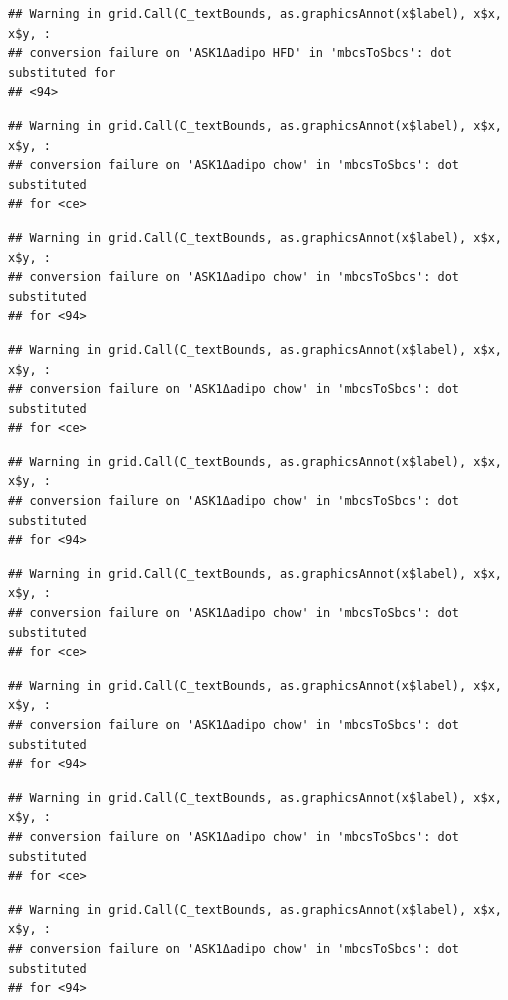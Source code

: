 \documentclass[]{book}
\begin{document}
\begin{verbatim}
## Warning in grid.Call(C_textBounds, as.graphicsAnnot(x$label), x$x, x$y, :
## conversion failure on 'ASK1Δadipo HFD' in 'mbcsToSbcs': dot substituted for
## <94>
\end{verbatim}

\begin{verbatim}
## Warning in grid.Call(C_textBounds, as.graphicsAnnot(x$label), x$x, x$y, :
## conversion failure on 'ASK1Δadipo chow' in 'mbcsToSbcs': dot substituted
## for <ce>
\end{verbatim}

\begin{verbatim}
## Warning in grid.Call(C_textBounds, as.graphicsAnnot(x$label), x$x, x$y, :
## conversion failure on 'ASK1Δadipo chow' in 'mbcsToSbcs': dot substituted
## for <94>
\end{verbatim}

\begin{verbatim}
## Warning in grid.Call(C_textBounds, as.graphicsAnnot(x$label), x$x, x$y, :
## conversion failure on 'ASK1Δadipo chow' in 'mbcsToSbcs': dot substituted
## for <ce>
\end{verbatim}

\begin{verbatim}
## Warning in grid.Call(C_textBounds, as.graphicsAnnot(x$label), x$x, x$y, :
## conversion failure on 'ASK1Δadipo chow' in 'mbcsToSbcs': dot substituted
## for <94>
\end{verbatim}

\begin{verbatim}
## Warning in grid.Call(C_textBounds, as.graphicsAnnot(x$label), x$x, x$y, :
## conversion failure on 'ASK1Δadipo chow' in 'mbcsToSbcs': dot substituted
## for <ce>
\end{verbatim}

\begin{verbatim}
## Warning in grid.Call(C_textBounds, as.graphicsAnnot(x$label), x$x, x$y, :
## conversion failure on 'ASK1Δadipo chow' in 'mbcsToSbcs': dot substituted
## for <94>
\end{verbatim}

\begin{verbatim}
## Warning in grid.Call(C_textBounds, as.graphicsAnnot(x$label), x$x, x$y, :
## conversion failure on 'ASK1Δadipo chow' in 'mbcsToSbcs': dot substituted
## for <ce>
\end{verbatim}

\begin{verbatim}
## Warning in grid.Call(C_textBounds, as.graphicsAnnot(x$label), x$x, x$y, :
## conversion failure on 'ASK1Δadipo chow' in 'mbcsToSbcs': dot substituted
## for <94>
\end{verbatim}
\end{document}
